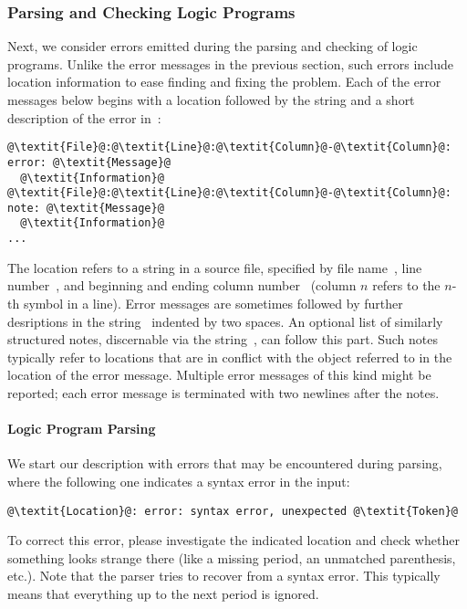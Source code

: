 \subsubsection{Parsing and Checking Logic Programs}\label{subsec:error:parselp}

Next, we consider errors emitted during the parsing and checking of logic programs.
Unlike the error messages in the previous section, 
such errors include location information to ease finding and fixing the problem.
Each of the error messages below begins with a location followed by the string  and a short description of the error in~:
\begin{lstlisting}[numbers=none,escapechar=@]
@\textit{File}@:@\textit{Line}@:@\textit{Column}@-@\textit{Column}@: error: @\textit{Message}@
  @\textit{Information}@
@\textit{File}@:@\textit{Line}@:@\textit{Column}@-@\textit{Column}@: note: @\textit{Message}@
  @\textit{Information}@
...

\end{lstlisting}
The location refers to a string in a source file,
specified by file name~,
line number~,
and beginning and ending column number~
(column $n$ refers to the $n$-th symbol in a line).
Error messages are sometimes followed by further desriptions in the string~ indented by two spaces.
An optional list of similarly structured notes, discernable via the string~, can follow this part.
Such notes typically refer to locations that are in conflict with the object referred to in the location of the error message.
Multiple error messages of this kind might be reported;
each error message is terminated with two newlines after the notes.

\paragraph{Logic Program Parsing}
We start our description with errors that may be encountered during parsing,
where the following one indicates a syntax error in the input:
%
\begin{lstlisting}[numbers=none,escapechar=@]
@\textit{Location}@: error: syntax error, unexpected @\textit{Token}@
\end{lstlisting}
%
To correct this error, please investigate the indicated location
and check whether something looks strange there
(like a missing period, an unmatched parenthesis, etc.).
Note that the parser tries to recover from a syntax error.
This typically means that everything up to the next period is ignored.


